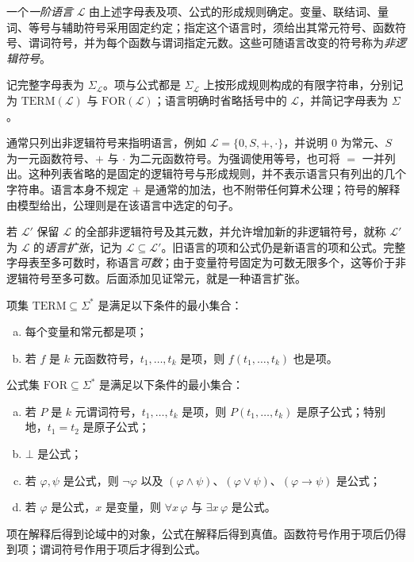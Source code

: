 \documentclass[lang=cn,a4paper,fontset=none,zihao=false,10pt,openany,twoside]{beautybook}
\numberwithin{algorithm}{chapter}
\newcommand{\FOR}{\mathrm{FOR}}
\begin{document}
\begin{definition}[一阶语言]\label{def:first-order-language}
一个\emph{一阶语言} $\mathcal L$ 由上述字母表及项、公式的形成规则确定。变量、联结词、量词、等号与辅助符号采用固定约定；指定这个语言时，须给出其常元符号、函数符号、谓词符号，并为每个函数与谓词指定元数。这些可随语言改变的符号称为\emph{非逻辑符号}。

记完整字母表为 $\Sigma_{\mathcal L}$。项与公式都是 $\Sigma_{\mathcal L}$ 上按形成规则构成的有限字符串，分别记为 $\mathrm{TERM}(\mathcal L)$ 与 $\FOR(\mathcal L)$；语言明确时省略括号中的 $\mathcal L$，并简记字母表为 $\Sigma$。
\end{definition}
通常只列出非逻辑符号来指明语言，例如 $\mathcal L=\{0,S,+,\cdot\}$，并说明 $0$ 为常元、$S$ 为一元函数符号、$+$ 与 $\cdot$ 为二元函数符号。为强调使用等号，也可将 $=$ 一并列出。这种列表省略的是固定的逻辑符号与形成规则，并不表示语言只有列出的几个字符串。语言本身不规定 $+$ 是通常的加法，也不附带任何算术公理；符号的解释由模型给出，公理则是在该语言中选定的句子。

若 $\mathcal L'$ 保留 $\mathcal L$ 的全部非逻辑符号及其元数，并允许增加新的非逻辑符号，就称 $\mathcal L'$ 为 $\mathcal L$ 的\emph{语言扩张}，记为 $\mathcal L\subseteq\mathcal L'$。旧语言的项和公式仍是新语言的项和公式。完整字母表至多可数时，称语言\emph{可数}；由于变量符号固定为可数无限多个，这等价于非逻辑符号至多可数。后面添加见证常元，就是一种语言扩张。

\begin{definition}[项]
项集 $\mathrm{TERM}\subseteq\Sigma^*$ 是满足以下条件的最小集合：
\begin{enumerate}[(a)]
\item 每个变量和常元都是项；
\item 若 $f$ 是 $k$ 元函数符号，$t_1,\ldots,t_k$ 是项，则 $f(t_1,\ldots,t_k)$ 也是项。
\end{enumerate}
\end{definition}
\begin{definition}[一阶公式]
公式集 $\FOR\subseteq\Sigma^*$ 是满足以下条件的最小集合：
\begin{enumerate}[(a)]
\item 若 $P$ 是 $k$ 元谓词符号，$t_1,\ldots,t_k$ 是项，则 $P(t_1,\ldots,t_k)$ 是原子公式；特别地，$t_1=t_2$ 是原子公式；
\item $\bot$ 是公式；
\item 若 $\varphi,\psi$ 是公式，则 $\neg\varphi$ 以及 $(\varphi\wedge\psi)$、$(\varphi\vee\psi)$、$(\varphi\to\psi)$ 是公式；
\item 若 $\varphi$ 是公式，$x$ 是变量，则 $\forall x\,\varphi$ 与 $\exists x\,\varphi$ 是公式。
\end{enumerate}
\end{definition}
项在解释后得到论域中的对象，公式在解释后得到真值。函数符号作用于项后仍得到项；谓词符号作用于项后才得到公式。
\end{document}
